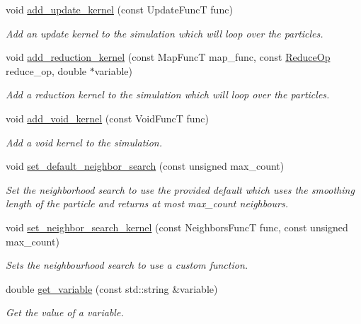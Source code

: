 \begin{DoxyCompactItemize}
void \mbox{\hyperlink{namespacewash_abc27c958fb1156da77a1346c3559abc1}{add\+\_\+update\+\_\+kernel}} (const Update\+FuncT func)
\begin{DoxyCompactList}\small\item\em Add an update kernel to the simulation which will loop over the particles. \end{DoxyCompactList}\item 
void \mbox{\hyperlink{namespacewash_a730e8352e9361e6ef88fd4b4c21e7f8c}{add\+\_\+reduction\+\_\+kernel}} (const Map\+FuncT map\+\_\+func, const \mbox{\hyperlink{namespacewash_a9c59e8c142d63d8640921c1b1957807e}{Reduce\+Op}} reduce\+\_\+op, double $\ast$variable)
\begin{DoxyCompactList}\small\item\em Add a reduction kernel to the simulation which will loop over the particles. \end{DoxyCompactList}\item 
void \mbox{\hyperlink{namespacewash_ab49fcc701f7afced2186465ba5cce978}{add\+\_\+void\+\_\+kernel}} (const Void\+FuncT func)
\begin{DoxyCompactList}\small\item\em Add a void kernel to the simulation. \end{DoxyCompactList}\item 
void \mbox{\hyperlink{namespacewash_abc2e79908c969eabb61a865c8f279d02}{set\+\_\+default\+\_\+neighbor\+\_\+search}} (const unsigned max\+\_\+count)
\begin{DoxyCompactList}\small\item\em Set the neighborhood search to use the provided default which uses the smoothing length of the particle and returns at most max\+\_\+count neighbours. \end{DoxyCompactList}\item 
void \mbox{\hyperlink{namespacewash_a49d266f2bd4daa1a1de50dab5a4250df}{set\+\_\+neighbor\+\_\+search\+\_\+kernel}} (const Neighbors\+FuncT func, const unsigned max\+\_\+count)
\begin{DoxyCompactList}\small\item\em Sets the neighbourhood search to use a custom function. \end{DoxyCompactList}\item 
double \mbox{\hyperlink{namespacewash_a6c61472c6ffa0cb654bc9497292b7f30}{get\+\_\+variable}} (const std\+::string \&variable)
\begin{DoxyCompactList}\small\item\em Get the value of a variable. \end{DoxyCompactList}\item 

\end{DoxyCompactItemize}
